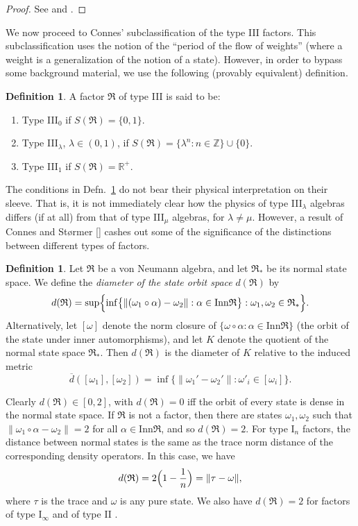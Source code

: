 \documentclass[11pt]{article}
\newcommand{\norm}[1]{\| #1\|}
\theoremstyle{definition}
\theoremstyle{definition}
\newtheorem{defn}[thm]{Definition}
\theoremstyle{remark}
\def\7#1{{\mathbb #1}}
\def\ol#1{{\overline #1}}
\def\al#1{{\mathfrak #1}}
\def\a{\alpha} \def\b{\beta} \def\g{\gamma} \def\d{\delta}
\def\om{\omega} \def\Om{\Omega} \def\dd{\partial} \def\D{\Delta}
\newcommand{\Inn}{\mathrm{Inn}}
\begin{document}
\begin{proof} See \cite[p.\ 122]{tak2} and \cite[p.\ 111]{sunder}.
\end{proof}

We now proceed to Connes' subclassification of the type III factors.
This subclassification uses the notion of the ``period of the flow of
weights'' (where a weight is a generalization of the notion of a
state).  However, in order to bypass some background material, we use
the following (provably equivalent) definition.

  \begin{defn} A factor $\al R$ of type III is said to be:
\begin{enumerate}
\item Type III$_0$ if $S(\al R)=\{ 0,1\}$.
\item Type III$_\lambda$, $\lambda \in (0,1)$, if $S(\al R) = \{
  \lambda ^n :n\in \7Z \} \cup \{ 0\}$.
\item Type III$_1$ if $S(\al R)=\7R ^+$.
\end{enumerate} \label{connes}
\end{defn} 

The conditions in Defn.\ \ref{connes} do not bear their physical
interpretation on their sleeve.  That is, it is not immediately clear
how the physics of type III$_{\lambda}$ algebras differs (if at all)
from that of type III$_\mu$ algebras, for $\lambda \neq \mu$.
However, a result of Connes and St{\o}rmer [\citeyear{consto}] cashes
out some of the significance of the distinctions between different
types of factors.

\begin{defn} Let $\al R$ be a von Neumann algebra, and let $\al R_*$
  be its normal state space.  We define the \emph{diameter of the
    state orbit space} $d(\al R)$ by 
$$ d (\al R) = \sup \Bigl\{ \inf \bigl\{ \norm{ (\om _1\circ \a )-\om _2 } :
\a \in \Inn \al R \bigr\} : \om _1,\om _2 \in \al R_{*}
\Bigr\} .$$ Alternatively, let $[\om ]$ denote the norm
closure of $\{ \om \circ \a :\a \in \Inn \al R\}$ (the
orbit of the state under inner automorphisms), and let
$K$ denote the quotient of the normal state space $\al
R_*$.  Then $d(\al R)$ is the diameter of $K$ relative
to the induced metric
\[ \ol d([\om _1],[\om _2]) = \inf \{ \norm{\om _1'-\om _2'} :\om '_i\in
[\om _i] \} .\] 
\end{defn}

Clearly $d(\al R )\in [0,2]$, with $d(\al R)=0$ iff the
orbit of every state is dense in the normal state
space.  If $\al R$ is not a factor, then there are
states $\om _1,\om _2$ such that $\norm{\om _1\circ \a
  -\om _2}=2$ for all $\a \in \Inn \al R$, and so
$d(\al R)=2$.  For type I$_n$ factors, the distance
between normal states is the same as the trace norm
distance of the corresponding density operators.  In
this case, we have
$$d(\al R)= 2\Bigl( 1-\frac{1}{n} \Bigr) =\norm{\tau -\om },$$
where $\tau$ is the trace and $\om$ is any pure state.  We also have
$d(\al R)=2$ for factors of type I$_\infty$ and of type II \cite[p.\
430]{tak2}.
\end{document}
